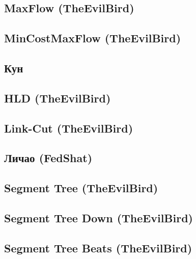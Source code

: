 \documentclass[a4paper]{article}
\begin{document}
\begin{multicols*}{2}
        \subsection{MaxFlow (TheEvilBird)}
            
                
        \subsection{MinCostMaxFlow (TheEvilBird)}
            
            
        \subsection{Кун}
            
        
        \subsection{HLD (TheEvilBird)}
            

        \subsection{Link-Cut (TheEvilBird)}
            
        
        \subsection{Личао (FedShat)}
            
            
        \subsection{Segment Tree (TheEvilBird)}
            
        
        \subsection{Segment Tree Down (TheEvilBird)}
            
        
        \subsection{Segment Tree Beats (TheEvilBird)}
            
        

\end{multicols*}
\end{document}
